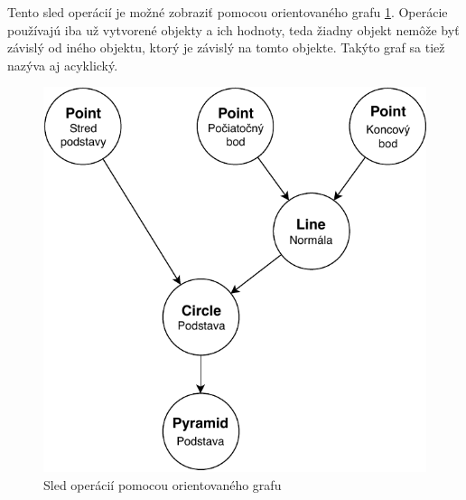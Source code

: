 Tento sled operácií je možné zobraziť pomocou orientovaného grafu \ref{fig:Sled_operácii_pomocou_orientovaného_grafu}. 
Operácie používajú iba už vytvorené objekty a ich hodnoty, teda žiadny objekt nemôže byť závislý od iného objektu, ktorý je závislý na tomto objekte. Takýto graf sa tiež nazýva aj acyklický. 


\begin{figure}[H]
	\centering
	\includegraphics[height=0.6\textwidth]{obrazky-figures/DP Navrh operacii-Strom.pdf}
	\caption{Sled operácií pomocou orientovaného grafu}
	\label{fig:Sled_operácii_pomocou_orientovaného_grafu}
\end{figure}



















